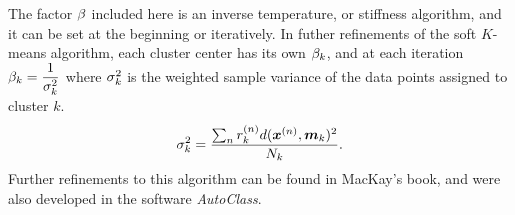 The factor \(\beta\) included here is an inverse temperature, or stiffness 
algorithm, and it can be set at the beginning or iteratively.  In futher 
refinements of the soft $K$-means algorithm, each cluster center has its own
\(\beta_k\), and at each iteration \(\beta_k = \dfrac{1}{\sigma_k^2}\) where 
\(\sigma_k^{2}\) is the weighted sample variance of the data points assigned to 
cluster $k$.
\begin{equation}\label{isoSigma}
\sigma_k^{2} = \frac{\sum_n r_k^{(n)}d(\bm x^{(n)},\bm m_k)^2}{N_k}.
\end{equation}
Further refinements to this algorithm can be found in MacKay's book, and were 
also developed in the software \textit{AutoClass}. \cite{MacKay2002,AutoClass1,AutoClass2}
